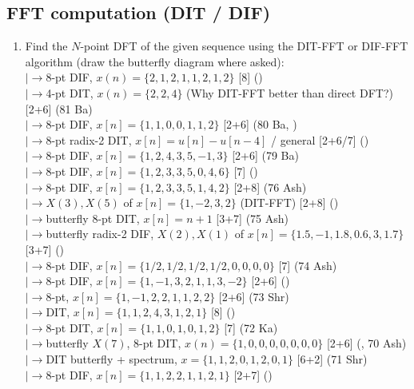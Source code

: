 \documentclass[12pt]{article}
\newcommand{\lb}{\\$\left|\rightarrow\right.$}
\begin{document}
  \subsection{FFT computation (DIT / DIF)}
    \begin{enumerate}[topsep=0pt, noitemsep]
      \item Find the $N$-point DFT of the given sequence using the DIT-FFT or DIF-FFT algorithm (draw the butterfly diagram where asked):
        \lb 8-pt DIF, $x(n)=\{2,1,2,1,1,2,1,2\}$ \hfill [8] ()
        \lb 4-pt DIT, $x(n)=\{2,2,4\}$ (Why DIT-FFT better than direct DFT?) \hfill [2+6] (81 Ba)
        \lb 8-pt DIF, $x[n]=\{1,1,0,0,1,1,2\}$ \hfill [2+6] (80 Ba, )
        \lb 8-pt radix-2 DIT, $x[n]=u[n]-u[n-4]$ / general \hfill [2+6/7] ()
        \lb 8-pt DIF, $x[n]=\{1,2,4,3,5,-1,3\}$ \hfill [2+6] (79 Ba)
        \lb 8-pt DIF, $x[n]=\{1,2,3,3,5,0,4,6\}$ \hfill [7] ()
        \lb 8-pt DIF, $x[n]=\{1,2,3,3,5,1,4,2\}$ \hfill [2+8] (76 Ash)
        \lb $X(3),X(5)$ of $x[n]=\{1,-2,3,2\}$ (DIT-FFT) \hfill [2+8] ()
        \lb butterfly 8-pt DIT, $x[n]=n+1$ \hfill [3+7] (75 Ash)
        \lb butterfly radix-2 DIF, $X(2),X(1)$ of $x[n]=\{1.5,-1,1.8,0.6,3,1.7\}$ \hfill [3+7] ()
        \lb 8-pt DIF, $x[n]=\{1/2,1/2,1/2,1/2,0,0,0,0\}$ \hfill [7] (74 Ash)
        \lb 8-pt DIF, $x[n]=\{1,-1,3,2,1,1,3,-2\}$ \hfill [2+6] ()
        \lb 8-pt, $x[n]=\{1,-1,2,2,1,1,2,2\}$ \hfill [2+6] (73 Shr)
        \lb DIT, $x[n]=\{1,1,2,4,3,1,2,1\}$ \hfill [8] ()
        \lb 8-pt DIT, $x[n]=\{1,1,0,1,0,1,2\}$ \hfill [7] (72 Ka)
        \lb butterfly $X(7)$, 8-pt DIT, $x(n)=\{1,0,0,0,0,0,0,0\}$ \hfill [2+6] (, 70 Ash)
        \lb DIT butterfly + spectrum, $x=\{1,1,2,0,1,2,0,1\}$ \hfill [6+2] (71 Shr)
        \lb 8-pt DIF, $x[n]=\{1,1,2,2,1,1,2,1\}$ \hfill [2+7] ()
    \end{enumerate}
\end{document}
